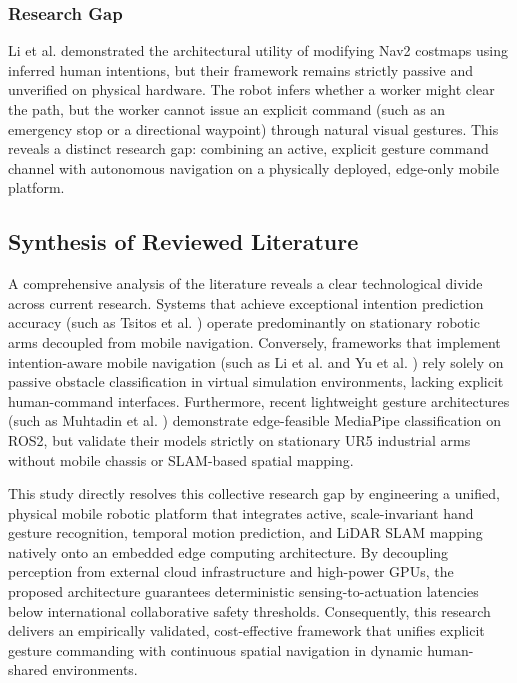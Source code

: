 \subsubsection{Research Gap}
Li et al. demonstrated the architectural utility of modifying Nav2 costmaps using inferred human intentions, but their framework remains strictly passive and unverified on physical hardware. The robot infers whether a worker might clear the path, but the worker cannot issue an explicit command (such as an emergency stop or a directional waypoint) through natural visual gestures. This reveals a distinct research gap: combining an active, explicit gesture command channel with autonomous navigation on a physically deployed, edge-only mobile platform.

\subsection{Synthesis of Reviewed Literature}
A comprehensive analysis of the literature reveals a clear technological divide across current research. Systems that achieve exceptional intention prediction accuracy (such as Tsitos et al. \cite{tsitos2022}) operate predominantly on stationary robotic arms decoupled from mobile navigation. Conversely, frameworks that implement intention-aware mobile navigation (such as Li et al. \cite{li2023} and Yu et al. \cite{yu2024}) rely solely on passive obstacle classification in virtual simulation environments, lacking explicit human-command interfaces. Furthermore, recent lightweight gesture architectures (such as Muhtadin et al. \cite{muhtadin2025}) demonstrate edge-feasible MediaPipe classification on ROS2, but validate their models strictly on stationary UR5 industrial arms without mobile chassis or SLAM-based spatial mapping.

This study directly resolves this collective research gap by engineering a unified, physical mobile robotic platform that integrates active, scale-invariant hand gesture recognition, temporal motion prediction, and LiDAR SLAM mapping natively onto an embedded edge computing architecture. By decoupling perception from external cloud infrastructure and high-power GPUs, the proposed architecture guarantees deterministic sensing-to-actuation latencies below international collaborative safety thresholds. Consequently, this research delivers an empirically validated, cost-effective framework that unifies explicit gesture commanding with continuous spatial navigation in dynamic human-shared environments.

